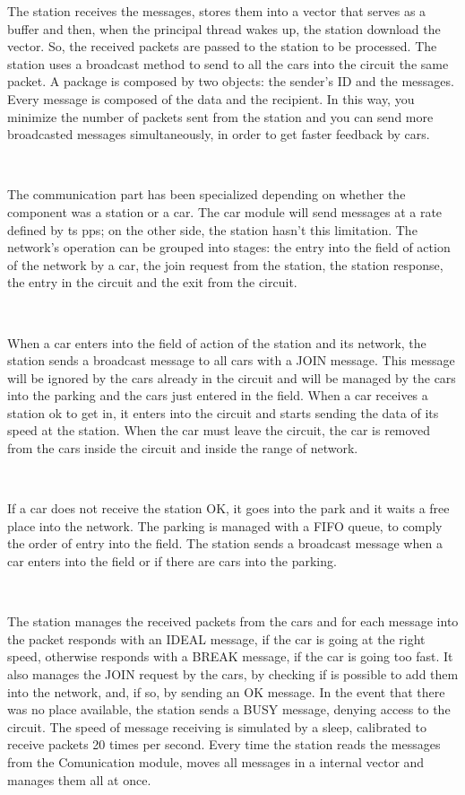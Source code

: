 \documentclass[a4paper,titlepage]{article}
\begin{document}
The station receives the messages, stores them into a vector that serves as a buffer and then, when the principal thread wakes up, the station download the vector. So, the received packets are passed to the station to be processed.
The station uses a broadcast method to send to all the cars into the circuit the same packet.
A package is composed by two objects: the sender's ID and the messages. Every message is composed of the data and the recipient. In this way, you minimize the number of packets sent from the station and you can send more broadcasted messages simultaneously, in order to get faster feedback by cars.

~

The communication part has been specialized depending on whether the component was a station or a car. The car module will send messages at a rate defined by ts pps; on the other side, the station hasn't this limitation. 
The network's operation can be grouped into stages: the entry into the field of action of the network by a car, the join request from the station, the station response, the entry in the circuit and the exit from the circuit.

~

When a car enters into the field of action of the station and its network, the station sends a broadcast message to all cars with a JOIN message. This message will be ignored by the cars already in the circuit and will be managed by the cars into the parking and the cars just entered in the field. When a car receives a station ok to get in, it enters into the circuit and starts sending the data of its speed at the station. When the car must leave the circuit, the car is removed from the cars inside the circuit and inside the range of network.

~

If a car does not receive the station OK, it goes into the park and it waits a free place into the network.
The parking is managed with a FIFO queue, to comply the order of entry into the field.
The station sends a broadcast message when a car enters into the field or if there are cars into the parking.

~

The station manages the received packets from the cars and for each message into the packet responds with an IDEAL message, if the car is going at the right speed, otherwise responds with a BREAK message, if the car is going too fast.
It also manages the JOIN request by the cars, by checking if is possible to add them into the network, and, if so, by sending an OK message. In the event that there was no place available, the station sends a BUSY message, denying access to the circuit.
The speed of message receiving is simulated by a sleep, calibrated to receive packets 20 times per second. Every time the station reads the messages from the Comunication module, moves all messages in a internal vector and manages them all at once.
\end{document}
